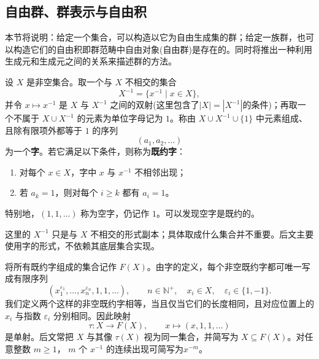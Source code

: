 \subsection{自由群、群表示与自由积}\label{sec:free-groups}

\begin{purplenote}
本节将说明：给定一个集合，可以构造以它为自由生成集的群；给定一族群，也可以构造它们的自由积即群范畴中自由对象(自由群)是存在的。同时将推出一种利用生成元和生成元之间的关系来描述群的方法。
\end{purplenote}

\begin{definition}[自由群的既约字模型]\label{def:free-group-reduced-words}
设 $X$ 是非空集合。取一个与 $X$ 不相交的集合
\[
  X^{-1}=\{x^{-1}\mid x\in X\},
\]
并令 $x\mapsto x^{-1}$ 是 $X$ 与 $X^{-1}$ 之间的双射(这里包含了$|X|=|X^{-1}|$的条件)；再取一个不属于 $X\cup X^{-1}$ 的元素为单位字母记为 $1$。称由 $X\cup X^{-1}\cup\{1\}$ 中元素组成、且除有限项外都等于 $1$ 的序列
\[
  (a_1,a_2,\ldots)
\]
为一个\textbf{字}。若它满足以下条件，则称为\textbf{既约字}：
\begin{enumerate}[label=(\arabic*)]
  \item 对每个 $x\in X$，字中 $x$ 与 $x^{-1}$ 不相邻出现；
  \item 若 $a_k=1$，则对每个 $i\geq k$ 都有 $a_i=1$。
\end{enumerate}
特别地，$(1,1,\ldots)$ 称为空字，仍记作 $1$。可以发现空字是既约的。
\end{definition}

\begin{purplenote}
这里的 $X^{-1}$ 只是与 $X$ 不相交的形式副本；具体取成什么集合并不重要。后文主要使用字的形式，不依赖其底层集合实现。
\end{purplenote}

\begin{purplenote}
将所有既约字组成的集合记作 $F(X)$。由字的定义，每个非空既约字都可唯一写成有限序列
\[
  (x_1^{\varepsilon_1},\ldots,x_n^{\varepsilon_n},1,1,\ldots),
  \qquad n\in\mathbb N^+,\quad x_i\in X,\quad \varepsilon_i\in\{1,-1\}.
\]
我们定义两个这样的非空既约字相等，当且仅当它们的长度相同，且对应位置上的 $x_i$ 与指数 $\varepsilon_i$ 分别相同。因此映射
\[
  \tau:X\longrightarrow F(X),\qquad x\longmapsto(x,1,1,\ldots)
\]
是单射。后文常把 $X$ 与其像 $\tau(X)$ 视为同一集合，并简写为 $X\subseteq F(X)$。对任意整数 $m\geq1$， $m$ 个 $x^{-1}$ 的连续出现可简写为$x^{-m}$。
\end{purplenote}

